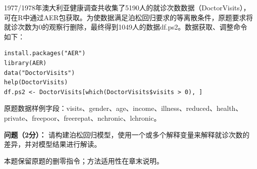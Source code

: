 \par\addvspace{8pt}\noindent\begin{minipage}{\linewidth}


1977/1978年澳大利亚健康调查共收集了5190人的就诊次数数据（DoctorVisits），可在R中通过AER包获取。为使数据满足泊松回归要求的等离散条件，原题要求将就诊次数为0的观察行删除，最终得到1049人的数据df.ps2。数据获取、调整命令如下：

\begin{verbatim}
install.packages("AER")
library(AER)
data("DoctorVisits")
help(DoctorVisits)
df.ps2 <- DoctorVisits[which(DoctorVisits$visits > 0), ]
\end{verbatim}

原题数据样例字段：visits、gender、age、income、illness、reduced、health、private、freepoor、freerepat、nchronic、lchronic。

\textbf{问题（2分）：} 请构建泊松回归模型，使用一个或多个解释变量来解释就诊次数的差异，并对模型结果进行解读。

本题保留原题的删零指令；方法适用性在章末说明。



\end{minipage}\par\vspace{5pt}

